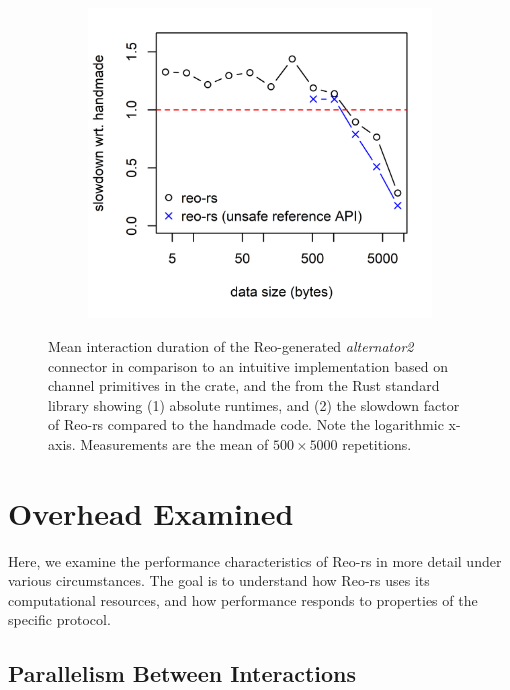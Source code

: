 \begin{figure}
{\begin{subfigure}[b]{0.63\textwidth}
			\includegraphics[width=\textwidth]{experiments/alternator_1.png}
			\caption{}
			\label{fig:alternator2_runtime_1}
		\end{subfigure}%
	}
	\caption[Hand-crafted vs.\ Reo-generated alternator.]{Mean interaction duration of the Reo-generated \textit{alternator2} connector in comparison to an intuitive implementation based on channel primitives in the  crate, and the  from the Rust standard library showing (1) absolute runtimes, and (2) the slowdown factor of Reo-rs compared to the handmade code. Note the logarithmic x-axis. Measurements are the mean of $500\times{}5000$ repetitions.}
	\label{fig:alternator}
	\label{fig:alternator2_runtime}
\end{figure}

\section{Overhead Examined}
\label{sec:overhead_examined}
Here, we examine the performance characteristics of Reo-rs in more detail under various circumstances. The goal is to understand how Reo-rs uses its computational resources, and how performance responds to properties of the specific protocol.

\subsection{Parallelism Between Interactions}

